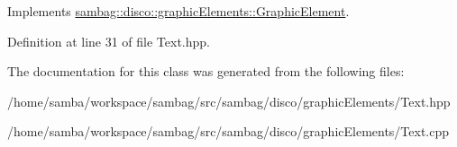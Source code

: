 Implements \hyperlink{classsambag_1_1disco_1_1graphic_elements_1_1_graphic_element_a2e07ce40a1a6a929e87dc291de7addff}{sambag::disco::graphicElements::GraphicElement}.



Definition at line 31 of file Text.hpp.



The documentation for this class was generated from the following files:\begin{DoxyCompactItemize}
\item 
/home/samba/workspace/sambag/src/sambag/disco/graphicElements/Text.hpp\item 
/home/samba/workspace/sambag/src/sambag/disco/graphicElements/Text.cpp\end{DoxyCompactItemize}
